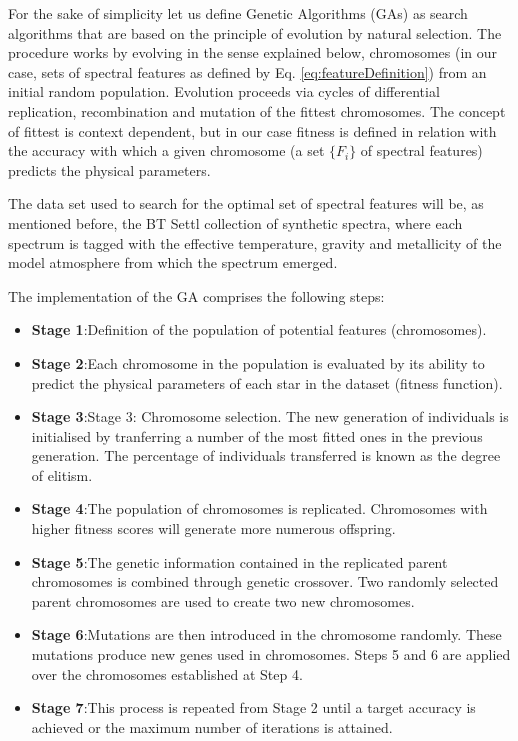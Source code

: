 For the sake of simplicity let us define Genetic Algorithms (GAs) as
search algorithms that are based on the principle of evolution by
natural selection. The procedure works by evolving in the sense
explained below, chromosomes (in our case, sets of spectral features
as defined by Eq. \ref{eq:featureDefinition}) from an initial random
population. Evolution proceeds via cycles of differential replication,
recombination and mutation of the fittest chromosomes. The concept of
fittest is context dependent, but in our case fitness is defined in
relation with the accuracy with which a given chromosome (a set
$\{F_i\}$ of spectral features) predicts the physical parameters.

The data set used to search for the optimal set of spectral features
will be, as mentioned before, the BT Settl collection of synthetic
spectra, where each spectrum is tagged with the effective temperature,
gravity and metallicity of the model atmosphere from which the
spectrum emerged.

The implementation of the GA comprises the following steps:

\begin{itemize}
\item \textbf{Stage 1}:{Definition of the population of
potential features (chromosomes).}

\item \textbf{Stage 2}:{Each chromosome in the population
is evaluated by its ability to predict the physical parameters of each
star in the dataset (fitness function). }

\item \textbf{Stage 3}:{Stage 3: Chromosome selection. The new
generation of individuals is initialised by tranferring a number of
the most fitted ones in the previous generation. The percentage of
individuals transferred is known as the degree of elitism. }

\item \textbf{Stage 4}:{The population of chromosomes is replicated. 
 Chromosomes with higher fitness scores will generate more numerous
 offspring.}

\item \textbf{Stage 5}:{The genetic information contained in
the replicated parent chromosomes is combined through genetic
crossover. Two randomly selected parent chromosomes are used to create
two new chromosomes.}

\item \textbf{Stage 6}:{Mutations are then introduced in the
chromosome randomly. These mutations produce new genes used in
chromosomes.  Steps 5 and 6 are applied over the chromosomes
established at Step 4.}

\item \textbf{Stage 7}:{This process is repeated from Stage 2 until 
a target accuracy is achieved or the maximum number of iterations is
attained.}

\end{itemize}

